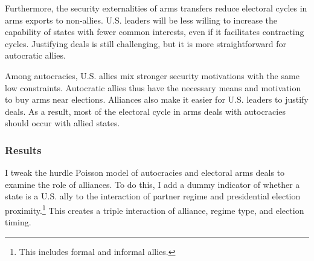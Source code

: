 \documentclass[12pt]{article}
\begin{document}
Furthermore, the security externalities of arms transfers reduce electoral cycles in arms exports to non-allies. 
U.S. leaders will be less willing to increase the capability of states with fewer common interests, even if it facilitates contracting cycles.
Justifying deals is still challenging, but it is more straightforward for autocratic allies. 







Among autocracies, U.S. allies mix stronger security motivations with the same low constraints. 
Autocratic allies thus have the necessary means and motivation to buy arms near elections. 
Alliances also make it easier for U.S. leaders to justify deals.
As a result, most of the electoral cycle in arms deals with autocracies should occur with allied states. 
 

 
\subsubsection{Results}

I tweak the hurdle Poisson model of autocracies and electoral arms deals to examine the role of alliances. 
To do this, I add a dummy indicator of whether a state is a U.S. ally to the interaction of partner regime and presidential election proximity.\footnote{This includes formal and informal allies.}
This creates a triple interaction of alliance, regime type, and election timing. 
\end{document}

